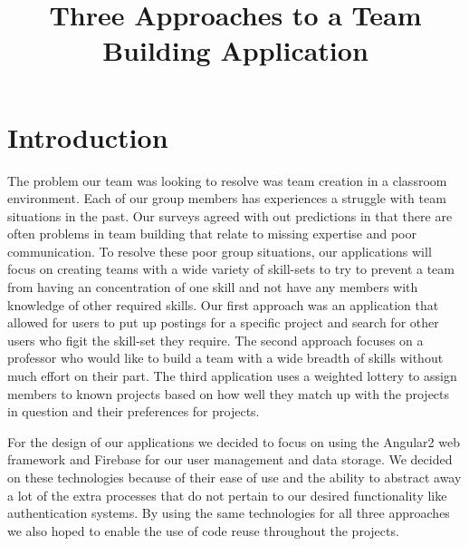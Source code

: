 \documentclass[conference]{IEEEtran}
\begin{document}
\title{Three Approaches to a Team Building Application}

\author{
}


\maketitle

\section{Introduction}
The problem our team was looking to resolve was team creation in a classroom environment. Each of our group members has experiences a struggle with team situations in the past. Our surveys agreed with out predictions in that there are often problems in team building that relate to missing expertise and poor communication. To resolve these poor group situations, our applications will focus on creating teams with a wide variety of skill-sets to try to prevent a team from having an concentration of one skill and not have any members with knowledge of other required skills. Our first approach was an application that allowed for users to put up postings for a specific project and search for other users who figit the skill-set they require. The second approach focuses on a professor who would like to build a team with a wide breadth of skills without much effort on their part. The third application uses a weighted lottery to assign members to known projects based on how well they match up with the projects in question and their preferences for projects. 

For the design of our applications we decided to focus on using the Angular2 web framework and Firebase for our user management and data storage. We decided on these technologies because of their ease of use and the ability to abstract away a lot of the extra processes that do not pertain to our desired functionality like authentication systems. By using the same technologies for all three approaches we also hoped to enable the use of code reuse throughout the projects. 
\end{document}

